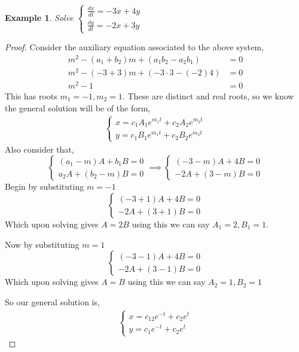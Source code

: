 \documentclass[oneside,11pt,pdftex,final]{book}%
\numberwithin{equation}{section}
\newtheorem{example}[theorem]{Example}
\numberwithin{section}{chapter}
\numberwithin{equation}{chapter}
\begin{document}
\begin{example}
	Solve $ \begin{cases}
		\frac{dx}{dt}=-3x+4y\\
		\frac{dy}{dt}=-2x+3y
	\end{cases} $
\end{example}
\begin{proof}
	Consider the auxiliary equation associated to the above system,
	\begin{align*}
		m^2-(a_1+b_2)m+(a_1b_2-a_2b_1)&=0\\
		m^2-(-3+3)m+(-3\cdot3-(-2)4)&=0\\
		m^2-1&=0
	\end{align*}
	This has roots $ m_1=-1,m_2=1 $. These are distinct and real roots, so we know the general solution will be of the form,
	\begin{align*}
		\begin{cases}
			x=c_1A_1e^{m_1t}+c_2A_2e^{m_2t}\\
			y=c_1B_1e^{m_1t}+c_2B_2e^{m_2t}
		\end{cases}
	\end{align*}
	Also consider that,
	\[ \begin{cases}
		(a_1-m)A+b_1B=0\\
		a_2A+(b_2-m)B=0
	\end{cases} \implies 
	\begin{cases}
		(-3-m)A+4B=0\\
		-2A+(3-m)B=0
	\end{cases}\]
	Begin by substituting $ m=-1 $
	\[ \begin{cases}
		(-3+1)A+4B=0\\
		-2A+(3+1)B=0
	\end{cases} \]
	Which upon solving gives $ A=2B $ using this we can say $A_1=2, B_1=1 $.
	
	Now by substituting $ m=1 $
	\[ \begin{cases}
		(-3-1)A+4B=0\\
		-2A+(3-1)B=0
	\end{cases} \]
	Which upon solving gives $ A=B $ using this we can say $A_2=1, B_2=1 $
	
	So our general solution is,
	\begin{align*}
		\begin{cases}
			x=c_12e^{-t}+c_2e^{t}\\
			y=c_1e^{-t}+c_2e^{t}
		\end{cases}
	\end{align*}
\end{proof}
\end{document}
